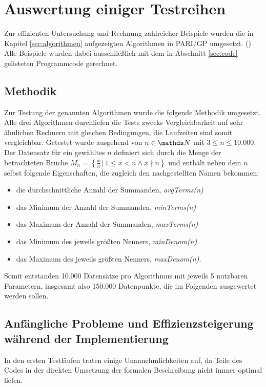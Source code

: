 \section{Auswertung einiger Testreihen}\label{sec:Testreihen}
Zur effizienten Untersuchung und Rechnung zahlreicher Beispiele wurden die in Kapitel \ref{sec:algorithmen} aufgezeigten Algorithmen in PARI/GP umgesetzt. (\cite{PARI2018})\\
Alle Beispiele wurden dabei ausschließlich mit dem in Abschnitt \ref{sec:code} gelisteten Programmcode gerechnet.

\subsection{Methodik}
Zur Testung der genannten Algorithmen wurde die folgende Methodik umgesetzt.
Alle drei Algorithmen durchliefen die Tests zwecks Vergleichbarkeit auf sehr ähnlichen Rechnern mit gleichen Bedingungen, die Laufzeiten sind somit vergleichbar.
Getestet wurde ausgehend von $n \in \N$ mit $3 \leq n \leq 10.000$.
Der Datensatz für ein gewähltes $n$ definiert sich durch die Menge der betrachteten Brüche $M_n = \left\{ \frac{x}{n} \, | \, 1\leq x < n \wedge x \nmid n\right\}$ und enthält neben dem $n$ selbst folgende Eigenschaften, die zugleich den nachgestellten Namen bekommen:
\begin{itemize}
	\item die durchschnittliche Anzahl der Summanden, \emph{avgTerms(n)}
	\item das Minimum der Anzahl der Summanden, \emph{minTerms(n)}
	\item das Maximum der Anzahl der Summanden, \emph{maxTerms(n)}
	\item das Minimum des jeweils größten Nenners, \emph{minDenom(n)}
	\item das Maximum des jeweils größten Nenners, \emph{maxDenom(n)}.
\end{itemize}
Somit entstanden 10.000 Datensätze pro Algorithmus mit jeweils 5 nutzbaren Parametern, insgesamt also 150.000 Datenpunkte, die im Folgenden ausgewertet werden sollen.

\subsection{Anfängliche Probleme und Effizienzsteigerung während der Implementierung}
In den ersten Testläufen traten einige Unannehmlichkeiten auf, da Teile des Codes in der direkten Umsetzung der formalen Beschreibung nicht immer optimal liefen.
